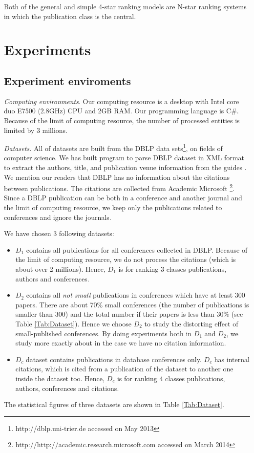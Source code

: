 \documentclass[10pt,leqno,twoside]{article}
\begin{document}
Both of the general and simple  4-star ranking models are N-star ranking systems in which the publication class is the central.



\section{Experiments}\label{Sect:Experiments}
\subsection{Experiment enviroments}\label{Sect:Dataset}
\textit{Computing environments}.
Our computing resource is a desktop with Intel core duo E7500 (2.8GHz) CPU and 2GB RAM.  Our programming language is C\#.
Because of the limit of computing resource, the number of processed entities is limited by 3 millions.

\textit{Datasets.} All of datasets are built from the DBLP data sets\footnote{http://dblp.uni-trier.de accessed on May 2013}, on fields of computer science. We has built program to parse DBLP dataset in XML format to extract the authors, title, and publication venue information from the guides \cite{MichaelLey09,MichaelLey06}. We mention our readers that DBLP has no information about the citations between publications. The citations are collected from Academic Microsoft \footnote{http://http://academic.research.microsoft.com accessed on March 2014}. Since a DBLP publication can be both in a conference and another journal and the limit of computing resource, we keep only the publications related to conferences and ignore the journals.


We have chosen 3 following datasets:
\begin{itemize}
\item $D_1$ contains all publications for all conferences collected in DBLP. Because of the limit of computing resource, we do not process the citations (which is about over 2 millions). Hence, $D_1$ is for ranking 3 classes publications, authors and conferences.
\item $D_2$ contains all \textit{not small} publications in conferences which have at least 300 papers. There are about 70\% small conferences (the number of publications is smaller than 300) and the total number if their papers is less than 30\% (see Table \ref{Tab:Dataset}). Hence we choose $D_2$ to study the distorting effect of small-published conferences. By doing experiments both in $D_1$ and $D_2$, we study more exactly about in the case we have no citation information.
\item $D_c$ dataset contains publications in database conferences only. $D_c$ has internal citations, which is cited from a publication of the dataset to another one inside the dataset too.  Hence, $D_c$ is for ranking 4 classes publications, authors, conferences and citations.
\end{itemize}
The statistical figures of three datasets are shown in Table \ref{Tab:Dataset}.
\end{document}
